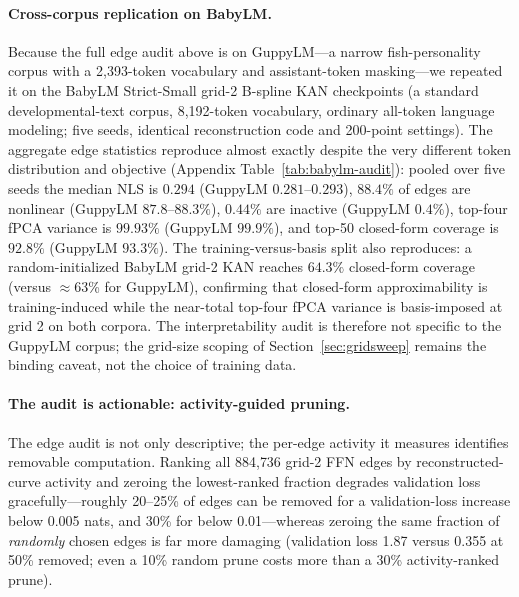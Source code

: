 \documentclass[11pt]{article}
\begin{document}
\paragraph{Cross-corpus replication on BabyLM.}
\label{sec:babylm-audit}
Because the full edge audit above is on GuppyLM---a narrow fish-personality corpus with a 2,393-token vocabulary and assistant-token masking---we repeated it on the BabyLM Strict-Small grid-2 B-spline KAN checkpoints (a standard developmental-text corpus, 8,192-token vocabulary, ordinary all-token language modeling; five seeds, identical reconstruction code and 200-point settings). The aggregate edge statistics reproduce almost exactly despite the very different token distribution and objective (Appendix Table~\ref{tab:babylm-audit}): pooled over five seeds the median NLS is \(0.294\) (GuppyLM \(0.281\)--\(0.293\)), \(88.4\%\) of edges are nonlinear (GuppyLM \(87.8\)--\(88.3\%\)), \(0.44\%\) are inactive (GuppyLM \(0.4\%\)), top-four fPCA variance is \(99.93\%\) (GuppyLM \(99.9\%\)), and top-50 closed-form coverage is \(92.8\%\) (GuppyLM \(93.3\%\)). The training-versus-basis split also reproduces: a random-initialized BabyLM grid-2 KAN reaches \(64.3\%\) closed-form coverage (versus \(\approx\)63\% for GuppyLM), confirming that closed-form approximability is training-induced while the near-total top-four fPCA variance is basis-imposed at grid 2 on both corpora. The interpretability audit is therefore not specific to the GuppyLM corpus; the grid-size scoping of Section~\ref{sec:gridsweep} remains the binding caveat, not the choice of training data.

\paragraph{The audit is actionable: activity-guided pruning.}
The edge audit is not only descriptive; the per-edge activity it measures identifies removable computation. Ranking all 884{,}736 grid-2 FFN edges by reconstructed-curve activity and zeroing the lowest-ranked fraction degrades validation loss gracefully---roughly 20--25\% of edges can be removed for a validation-loss increase below 0.005 nats, and 30\% for below 0.01---whereas zeroing the same fraction of \emph{randomly} chosen edges is far more damaging (validation loss 1.87 versus 0.355 at 50\% removed; even a 10\% random prune costs more than a 30\% activity-ranked prune).
\end{document}
